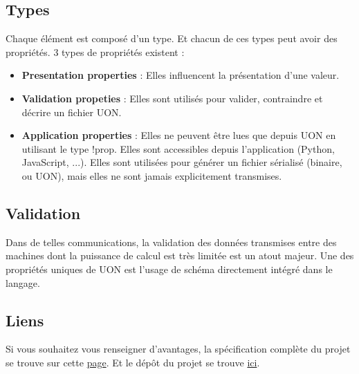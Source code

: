\documentclass[
    iict, %
    il, %
]{heig-tb}
\begin{document}
\subsection{Types}
Chaque élément est composé d'un type. Et chacun de ces types peut avoir des propriétés.
3 types de propriétés existent :
\begin{itemize}
    \item \textbf{Presentation properties} : Elles influencent la présentation d'une valeur.
    \item \textbf{Validation propeties} : Elles sont utilisés pour valider, contraindre et décrire un fichier UON.
    \item \textbf{Application properties} : Elles ne peuvent être lues que depuis UON en utilisant le type !prop. Elles sont accessibles depuis l'application (Python, JavaScript, ...). Elles sont utilisées pour générer un fichier sérialisé (binaire, ou UON), mais elles ne sont jamais explicitement transmises.
\end{itemize}

\subsection{Validation}
Dans de telles communications, la validation des données transmises entre des machines dont la puissance de calcul est très limitée est un atout majeur.
Une des propriétés uniques de UON est l'usage de schéma directement intégré dans le langage.


\subsection{Liens}
Si vous souhaitez vous renseigner d'avantages, la spécification complète du projet se trouve sur cette \href{https://github.com/uon-language/specification/}{page}.
Et le dépôt du projet se trouve \href{https://github.com/uon-language/specification}{ici}.



\end{document}
